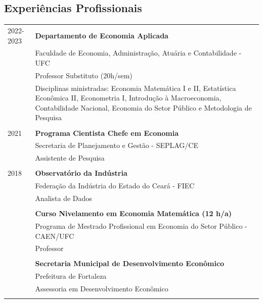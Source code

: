 \documentclass[a4paper,12pt]{article}
\begin{document}
	\subsection*{Experiências Profissionais}
	\setlength{\LTleft}{0pt}
	\begin{longtable}[t]{>{\raggedleft\arraybackslash}p{2.0cm}>{\raggedright\arraybackslash}p{13.5cm}}
		\textsc{2022-2023} & \textbf{Departamento de Economia Aplicada} \\
		& Faculdade de Economia, Administração, Atuária e Contabilidade - UFC \\
		& Professor Substituto (20h/sem) \\
		& Disciplinas ministradas: Economia Matemática I e II, Estatística Econômica II, Econometria I, Introdução à Macroeconomia, Contabilidade Nacional, Economia do Setor Público e Metodologia de Pesquisa \\
		\multicolumn{2}{c}{\vspace{-0.2cm}} \\

		\textsc{2021} & \textbf{Programa Cientista Chefe em Economia} \\
		& Secretaria de Planejamento e Gestão - SEPLAG/CE \\
		& Assistente de Pesquisa \\
		\multicolumn{2}{c}{\vspace{-0.2cm}} \\

		\textsc{2018} & \textbf{Observatório da Indústria} \\
		& Federação da Indústria do Estado do Ceará - FIEC \\
		& Analista de Dados \\
		\multicolumn{2}{c}{\vspace{-0.2cm}} \\

		2017 & \textbf{Curso Nivelamento em Economia Matemática (12 h/a)} \\
		& Programa de Mestrado Profissional em Economia do Setor Público - CAEN/UFC \\
		& Professor \\
		\multicolumn{2}{c}{\vspace{-0.2cm}} \\

		2017 & \textbf{Secretaria Municipal de Desenvolvimento Econômico} \\
		& Prefeitura de Fortaleza \\
		& Assessoria em Desenvolvimento Econômico \\
		\multicolumn{2}{c}{\vspace{-0.2cm}} \\


\end{longtable}
\end{document}
